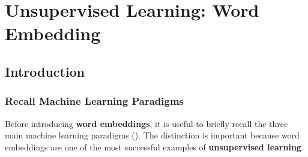 \section{Unsupervised Learning: Word Embedding}\label{sec:unsupervised-learning-word-embedding}

\subsection{Introduction}\label{sec:unsupervised-learning-word-embedding-introduction}

\subsubsection{Recall Machine Learning Paradigms}\label{sec:unsupervised-learning-word-embedding-introduction-recall-machine-learning-paradigms}

Before introducing \textbf{word embeddings}, it is useful to briefly recall the three main machine learning paradigms (). The distinction is important because word embeddings are one of the most successful examples of \textbf{unsupervised learning}.


